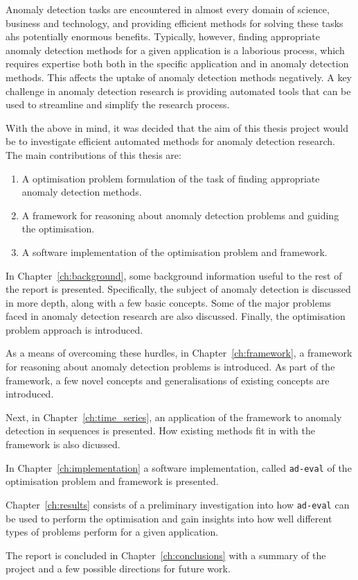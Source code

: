 
Anomaly detection tasks are encountered in almost every domain of science, business and technology, and providing efficient methods for solving these tasks ahs potentially enormous benefits. Typically, however, finding appropriate anomaly detection methods for a given application is a laborious process, which requires expertise both both in the specific application and in anomaly detection methods. This affects the uptake of anomaly detection methods negatively. A key challenge in anomaly detection research is providing automated tools that can be used to streamline and simplify the research process.

With the above in mind, it was decided that the aim of this thesis project would be to investigate efficient automated methods for anomaly detection research. The main contributions of this thesis are:
\begin{enumerate}
    \item A optimisation problem formulation of the task of finding appropriate anomaly detection methods.
    \item A framework for reasoning about anomaly detection problems and guiding the optimisation.
    \item A software implementation of the optimisation problem and framework.
\end{enumerate}

In Chapter~\ref{ch:background}, some background information useful to the rest of the report is presented. Specifically, the subject of anomaly detection is discussed in more depth, along with a few basic concepts. Some of the major problems faced in anomaly detection research are also discussed. Finally, the optimisation problem approach is introduced.

As a means of overcoming these hurdles, in Chapter~\ref{ch:framework}, a framework for reasoning about anomaly detection problems is introduced. As part of the framework, a few novel concepts and generalisations of existing concepts are introduced.

Next, in Chapter~\ref{ch:time_series}, an application of the framework to anomaly detection in sequences is presented. How existing methods fit in with the framework is also dicussed.

In Chapter~\ref{ch:implementation} a software implementation, called \texttt{ad-eval} of the optimisation problem and framework is presented.

Chapter~\ref{ch:results} consists of a preliminary investigation into how \texttt{ad-eval} can be used to perform the optimisation and gain insights into how well different types of problems perform for a given application.

The report is concluded in Chapter~\ref{ch:conclusions} with a summary of the project and a few possible directions for future work.
